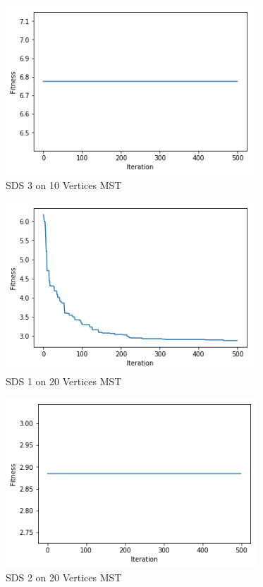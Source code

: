 \documentclass{AISB2008}
\begin{document}
{\begin{figure}
\centerline{\includegraphics[height=2.5in]{10MSTA3.png}}
\caption{SDS 3 on 10 Vertices MST}
\end{figure}


\begin{figure}
\centerline{\includegraphics[height=2.5in]{20MSTA1.png}}
\caption{SDS 1 on 20 Vertices MST}
\end{figure}

\begin{figure}
\centerline{\includegraphics[height=2.5in]{20MSTA2.png}}
\caption{SDS 2 on 20 Vertices MST}
\end{figure}

}
\end{document}
